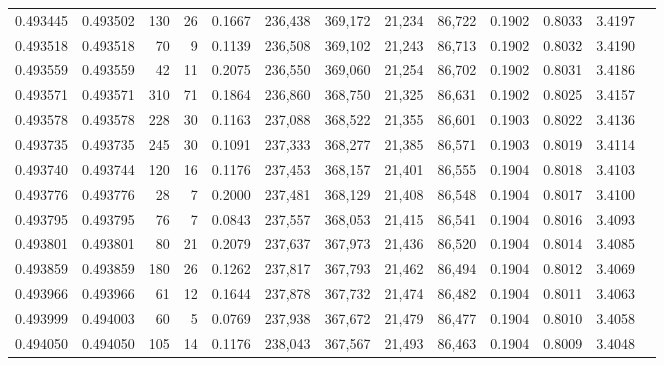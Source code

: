 \begin{tabular}{rrrrrrrrrrrrr}
0.493445 & 0.493502 &   130 &    26 &                                     0.1667 & 236,438 & 369,172 &  21,234 &  86,722 & 0.1902 & 0.8033 & 3.4197 \\
0.493518 & 0.493518 &    70 &     9 &                                     0.1139 & 236,508 & 369,102 &  21,243 &  86,713 & 0.1902 & 0.8032 & 3.4190 \\
0.493559 & 0.493559 &    42 &    11 &                                     0.2075 & 236,550 & 369,060 &  21,254 &  86,702 & 0.1902 & 0.8031 & 3.4186 \\
0.493571 & 0.493571 &   310 &    71 &                                     0.1864 & 236,860 & 368,750 &  21,325 &  86,631 & 0.1902 & 0.8025 & 3.4157 \\
0.493578 & 0.493578 &   228 &    30 &                                     0.1163 & 237,088 & 368,522 &  21,355 &  86,601 & 0.1903 & 0.8022 & 3.4136 \\
0.493735 & 0.493735 &   245 &    30 &                                     0.1091 & 237,333 & 368,277 &  21,385 &  86,571 & 0.1903 & 0.8019 & 3.4114 \\
0.493740 & 0.493744 &   120 &    16 &                                     0.1176 & 237,453 & 368,157 &  21,401 &  86,555 & 0.1904 & 0.8018 & 3.4103 \\
0.493776 & 0.493776 &    28 &     7 &                                     0.2000 & 237,481 & 368,129 &  21,408 &  86,548 & 0.1904 & 0.8017 & 3.4100 \\
0.493795 & 0.493795 &    76 &     7 &                                     0.0843 & 237,557 & 368,053 &  21,415 &  86,541 & 0.1904 & 0.8016 & 3.4093 \\
0.493801 & 0.493801 &    80 &    21 &                                     0.2079 & 237,637 & 367,973 &  21,436 &  86,520 & 0.1904 & 0.8014 & 3.4085 \\
0.493859 & 0.493859 &   180 &    26 &                                     0.1262 & 237,817 & 367,793 &  21,462 &  86,494 & 0.1904 & 0.8012 & 3.4069 \\
0.493966 & 0.493966 &    61 &    12 &                                     0.1644 & 237,878 & 367,732 &  21,474 &  86,482 & 0.1904 & 0.8011 & 3.4063 \\
0.493999 & 0.494003 &    60 &     5 &                                     0.0769 & 237,938 & 367,672 &  21,479 &  86,477 & 0.1904 & 0.8010 & 3.4058 \\
0.494050 & 0.494050 &   105 &    14 &                                     0.1176 & 238,043 & 367,567 &  21,493 &  86,463 & 0.1904 & 0.8009 & 3.4048 \\

\end{tabular}
